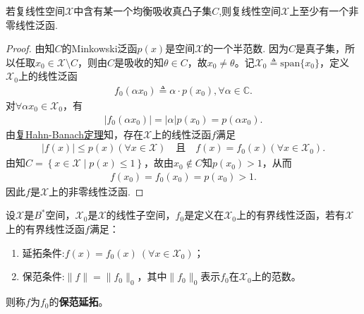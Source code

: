 \documentclass[../../main.tex]{subfiles}%
\begin{document}
\begin{theorem}
若复线性空间$\mathscr{X}$中含有某一个均衡吸收真凸子集$C$,则复线性空间$\mathscr{X}$上至少有一个非零线性泛函.
\end{theorem}
\begin{proof}
由知$C$的Minkowski泛函$p(x)$是空间$\mathscr{X}$的一个半范数.
因为$C$是真子集，所以任取$x_0\in \mathscr{X} \setminus C$，则由$C$是吸收的知$\theta \in C$，故$x_0\neq \theta$。记$\mathscr{X} _0\triangleq \mathrm{span}\{ x_0 \}$，定义$\mathscr{X} _0$上的线性泛函
\begin{align*}
f_0\left( \alpha x_0 \right) \triangleq \alpha \cdot p\left( x_0 \right) ,\forall \alpha \in \mathbb{C}.
\end{align*}
对$\forall \alpha x_0\in \mathscr{X} _0$，有
\begin{align*}
\left| f_0\left( \alpha x_0 \right) \right|=\left| \alpha \right|p\left( x_0 \right) =p\left( \alpha x_0 \right).
\end{align*}
由\hyperref[theorem:泛函分析--复Hahn-Banach定理]{复Hahn-Banach定理}知，存在$\mathscr{X}$上的线性泛函$f$满足
\begin{align*}
\left| f\left( x \right) \right|\leqslant p\left( x \right) \left( \forall x\in \mathscr{X} \right) \quad \text{且} \quad f\left( x \right) =f_0\left( x \right) \left( \forall x\in \mathscr{X} _0 \right).
\end{align*}
由知$C=\left\{ x\in \mathscr{X} \mid p\left( x \right) \leqslant 1 \right\}$，故由$x_0\notin C$知$p\left( x_0 \right) >1$，从而
\begin{align*}
f\left( x_0 \right) =f_0\left( x_0 \right) =p\left( x_0 \right) >1.
\end{align*}
因此$f$是$\mathscr{X}$上的非零线性泛函.
\end{proof}

\begin{definition}[保范延拓]
设$\mathscr{X}$是$B^*$空间，$\mathscr{X}_0$是$\mathscr{X}$的线性子空间，$f_0$是定义在$\mathscr{X}_0$上的有界线性泛函，若有$\mathscr{X}$上的有界线性泛函$f$满足：
\begin{enumerate}[(1)]
\item 延拓条件:$f(x) = f_0(x) \ (\forall x \in \mathscr{X}_0)$；
\item 保范条件:$\|f\| = \|f_0\|_0$，其中$\|f_0\|_0$表示$f_0$在$\mathscr{X}_0$上的范数。
\end{enumerate}
则称$f$为$f_0$的\textbf{保范延拓}。
\end{definition}
\end{document}
